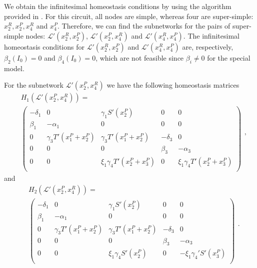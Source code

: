 We obtain the infinitesimal homeostasis conditions by using 
the algorithm provided in \cite{wang2021}. For this circuit, all
nodes are simple, whereas four are super-simple: $x_2^R, x_2^P,
x_4^R$ and $x_4^P$. Therefore, we can find the subnetworks for 
the pairs of super-simple nodes: $\mathcal{L}'(x_2^R, x_2^P)$,
$\mathcal{L}'(x_2^P, x_4^R)$ and $\mathcal{L}'(x_4^R, x_4^P)$.
The infinitesimal homeostasis conditions for 
$\mathcal{L}'(x_2^R, x_2^P)$ and $\mathcal{L}'(x_4^R, x_4^P)$
are, respectively, $\beta_2(I_0) = 0$ and $\beta_4(I_0) = 0$,
which are not feasible since $\beta_i \neq 0$ for the special model.

For the subnetwork $\mathcal{L}'(x_2^P, x_4^R)$ we have the 
following homeostasis matrices 
\begin{equation}
    \begin{split}
    &H_1(\mathcal{L}'(x_2^P, x_4^R)) =\\
    & \begin{pmatrix}
        -\delta_1 & 0 & \gamma_1 S'(x_2^P) & 0 & 0 \\
        \beta_1 & -\alpha_1 & 0 & 0 & 0 \\
        0 & \gamma_3T'(x_1^P + x_2^P) & \gamma_3T'(x_1^P + x_2^P) & -\delta_3 & 0 \\
        0 & 0 & 0 & \beta_3 & -\alpha_3 \\
        0 & 0 & \xi_1 \gamma_4 T'(x_2^P + x_3^P) & 0 & \xi_1 \gamma_4 T'(x_2^P + x_3^P) \\
    \end{pmatrix}
    \end{split},
\end{equation} 
and 
\begin{equation}
    \begin{split}
    &H_2(\mathcal{L}'(x_2^P, x_4^R)) =\\
    &\begin{pmatrix}
        -\delta_1 & 0 & \gamma_1 S'(x_2^P) & 0 & 0 \\
        \beta_1 & -\alpha_1 & 0 & 0 & 0 \\
        0 & \gamma_3T'(x_1^P + x_2^P) & \gamma_3T'(x_1^P + x_2^P) & -\delta_3 & 0 \\
        0 & 0 & 0 & \beta_3 & -\alpha_3 \\
        0 & 0 & \xi_1 \gamma_4 S'(x_2^P) & 0 & -\xi_1 \gamma_4' S'(x_3^P) \\
    \end{pmatrix}
    \end{split}.
\end{equation}

